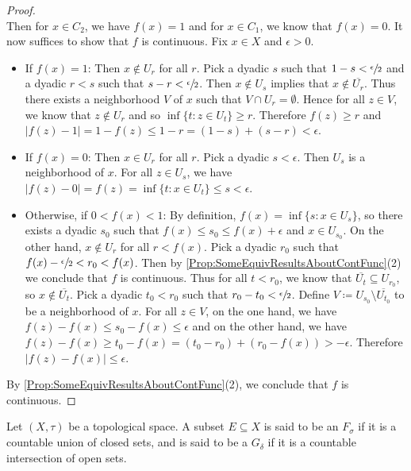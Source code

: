 \documentclass[screen,single]{techreport}
\numberwithin{equation}{section}
\begin{document}
\begin{proof}
\[	\]
	Then for $x \in C_2$, we have $f(x) = 1$ and for $x \in C_1$, we know that $f(x) = 0$.
	It now suffices to show that $f$ is continuous.
	Fix $x \in X$ and $\epsilon > 0$.
	\begin{itemize}
		\item If $f(x) = 1$: Then $x \not\in U_r$ for all $r$.
		Pick a dyadic $s$ such that $1 - s < \sfrac{\epsilon}{2}$ and a dyadic $r < s$ such that $s - r < \sfrac{\epsilon}{2}$.
		Then $x \not\in U_s$ implies that $x \not\in \overline{U_r}$.
		Thus there exists a neighborhood $V$ of $x$ such that $V \cap U_r = \emptyset$.
		Hence for all $z \in V$, we know that $z \not\in U_r$ and so $\inf\{t : z \in U_t\} \ge r$.
		Therefore $f(z) \ge r$ and $|f(z) - 1| = 1 - f(z) \le 1 - r = (1-s) + (s-r) < \epsilon$.
		
		\item If $f(x) = 0$: Then $x \in U_r$ for all $r$.
		Pick a dyadic $s < \epsilon$. Then $U_s$ is a neighborhood of $x$.
		For all $z \in U_s$, we have $|f(z) - 0| = f(z) = \inf\{ t : x \in U_t\} \le s < \epsilon$.
		
		\item Otherwise, if $0 < f(x) < 1$:
		By definition, $f(x) = \inf\{ s : x \in U_s\}$, so there exists a dyadic $s_0$ such that $f(x) \le s_0 \le f(x) + \epsilon$ and $x \in U_{s_0}$.
		On the other hand, $x \not\in U_r$ for all $r < f(x)$.
		Pick a dyadic $r_0$ such that $f(x) - \sfrac{\epsilon}{2} < r_0 < f(x)$.
		Then by \cref{Prop:SomeEquivResultsAboutContFunc}(2) we conclude that $f$ is continuous.
		Thus for all $t < r_0$, we know that $\overline{U_t} \subseteq U_{r_0}$, so $x \not\in \overline{U_t}$.
		Pick a dyadic $t_0 < r_0$ such that $r_0 - t_0 < \sfrac{\epsilon}{2}$.
		Define $V \coloneqq U_{s_0} \setminus \overline{U_{t_0}}$ to be a neighborhood of $x$.
		For all $z \in V$, on the one hand, we have $f(z) - f(x) \le s_0 - f(x) \le \epsilon$ and on the other hand, we have $f(z) - f(x) \ge t_0 - f(x) = (t_0 - r_0) + (r_0 - f(x)) > -\epsilon$.
		Therefore $|f(z) - f(x)| \le \epsilon$.
	\end{itemize}
	By \cref{Prop:SomeEquivResultsAboutContFunc}(2), we conclude that $f$ is continuous.
\end{proof}

\begin{definition}\label{De:FsigmaGdelta}
	Let $(X,\tau)$ be a topological space.
	A subset $E \subseteq X$ is said to be an $F_\sigma$ if it is a countable union of closed sets, and is said to be a $G_\delta$ if it is a countable intersection of open sets.
\end{definition}
\end{document}
